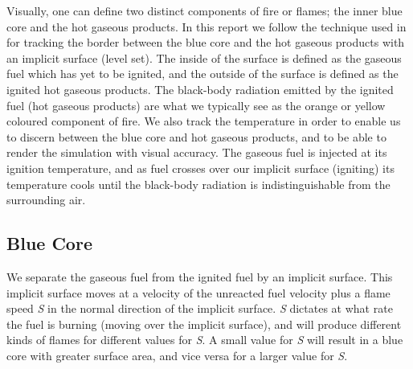 Visually, one can define two distinct components of fire or flames; the inner blue core and the hot gaseous products. In this report we follow the technique used in \cite{Nguyen02} for tracking the border between the blue core and the hot gaseous products with an implicit surface (level set). The inside of the surface is defined as the gaseous fuel which has yet to be ignited, and the outside of the surface is defined as the ignited hot gaseous products. The black-body radiation emitted by the ignited fuel (hot gaseous products) are what we typically see as the orange or yellow coloured component of fire. We also track the temperature in order to enable us to discern between the blue core and hot gaseous products, and to be able to render the simulation with visual accuracy. The gaseous fuel is injected at its ignition temperature, and as fuel crosses over our implicit surface (igniting) its temperature cools until the black-body radiation is indistinguishable from the surrounding air.
\subsection{Blue Core}
We separate the gaseous fuel from the ignited fuel by an implicit surface. This implicit surface moves at a velocity of the unreacted fuel velocity plus a flame speed \emph{S} in the normal direction of the implicit surface. \emph{S} dictates at what rate the fuel is burning (moving over the implicit surface), and will produce different kinds of flames for different values for \emph{S}. A small value for \emph{S} will result in a blue core with greater surface area, and vice versa for a larger value for \emph{S}.
